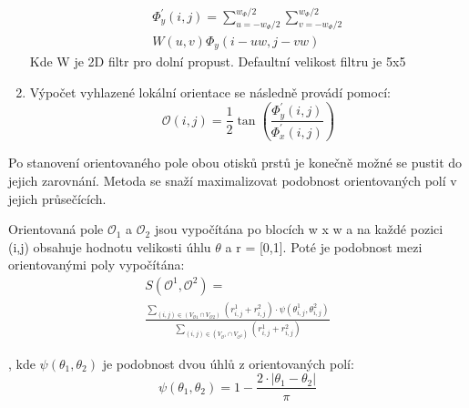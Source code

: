 \documentclass[a4paper,11pt]{article}
\begin{document}
\begin{multicols*}{2}
\begin{enumerate}
\begin{equation}
\begin{multlined}
                \end{multlined}
             \end{equation}
             \begin{equation}
                \begin{multlined}
                     \Phi_{y}^{\prime}(i, j)=\sum_{u=-w_{\Phi} / 2}^{w_{\Phi} / 2} \sum_{v=-w_{\Phi} / 2}^{w_{\Phi} / 2} \\ W(u, v) \Phi_{y}(i-u w, j-v w)
                \end{multlined}
             \end{equation}
             Kde W je 2D filtr pro dolní propust. Defaultní velikost filtru je 5x5
             \item Výpočet vyhlazené lokální orientace se následně provádí pomocí:
              \begin{equation}
                \mathcal{O}(i, j)=\frac{1}{2} \tan \left(\frac{\Phi_{y}^{\prime}(i, j)}{\Phi_{x}^{\prime}(i, j)}\right)
             \end{equation}
        \end{enumerate}\cite{ori}
    
    Po stanovení orientovaného pole obou otisků prstů je konečně možné se pustit do jejich zarovnání. Metoda se snaží maximalizovat podobnost orientovaných polí v jejich průsečících.
    
    Orientovaná pole $\mathcal{O}_1$ a $\mathcal{O}_2$ jsou vypočítána po blocích  w x w a na každé pozici (i,j) obsahuje hodnotu velikosti úhlu $\theta$ a r = [0,1]. Poté je podobnost mezi orientovanými poly vypočítána:
    \begin{equation}
        \begin{multlined}
        S\left(\mathcal{O}^{1}, \mathcal{O}^{2}\right)=\\
        \frac{\sum_{(i, j) \in\left(V_{\mathcal{O} 1} \cap V_{\mathcal{O} 2}\right)}\left(r_{i, j}^{1}+r_{i, j}^{2}\right) \cdot \psi\left(\theta_{i, j}^{1}, \theta_{i, j}^{2}\right)}{\sum_{(i, j) \in\left(V_{\mathcal{O}^{1}} \cap V_{\mathcal{O}^{2}}\right)}\left(r_{i, j}^{1}+r_{i, j}^{2}\right)}
        \end{multlined}
    \end{equation}
    
    , kde $\psi\left(\theta_{1}, \theta_{2}\right) $ je podobnost dvou úhlů z orientovaných polí:
    \begin{equation}
        \psi\left(\theta_{1}, \theta_{2}\right)=1-\frac{2 \cdot\left|\theta_{1}-\theta_{2}\right|}{\pi}
    \end{equation}
    

\end{multicols*}
\end{document}
